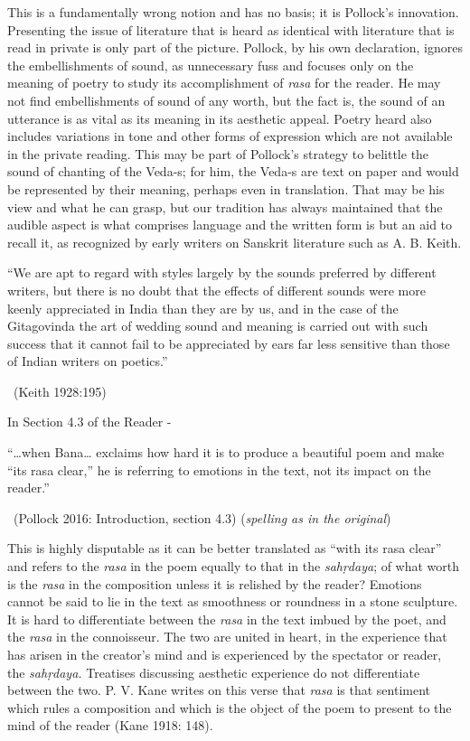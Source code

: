 This is a fundamentally wrong notion and has no basis; it is Pollock’s innovation. Presenting the issue of literature that is heard as identical with literature that is read in private is only part of the picture. Pollock, by his own declaration, ignores the embellishments of sound, as unnecessary fuss and focuses only on the meaning of poetry to study its accomplishment of \textit{rasa} for the reader. He may not find embellishments of sound of any worth, but the fact is, the sound of an utterance is as vital as its meaning in its aesthetic appeal. Poetry heard also includes variations in tone and other forms of expression which are not available in the private reading. This may be part of Pollock’s strategy to belittle the sound of chanting of the Veda-s; for him, the Veda-s are text on paper and would be represented by their meaning, perhaps even in translation. That may be his view and what he can grasp, but our tradition has always maintained that the audible aspect is what comprises language and the written form is but an aid to recall it, as recognized by early writers on Sanskrit literature such as A. B. Keith.

\begin{myquote}
“We are apt to regard with styles largely by the sounds preferred by different writers, but there is no doubt that the effects of different sounds were more keenly appreciated in India than they are by us, and in the case of the Gitagovinda the art of wedding sound and meaning is carried out with such success that it cannot fail to be appreciated by ears far less sensitive than those of Indian writers on poetics.” 

~\hfill (Keith 1928:195)
\end{myquote}

In Section 4.3 of the Reader -

\begin{myquote}
“…when Bana… exclaims how hard it is to produce a beautiful poem and make “its rasa clear,” he is referring to emotions in the text, not its impact on the reader.” 

~\hfill (Pollock 2016: Introduction, section 4.3) (\textit{spelling as in the original})
\end{myquote}

This is highly disputable as it can be better translated as “with its rasa clear” and refers to the \textit{rasa }in the poem equally to that in the \textit{sahṛdaya}; of what worth is the \textit{rasa} in the composition unless it is relished by the reader? Emotions cannot be said to lie in the text as smoothness or roundness in a stone sculpture. It is hard to differentiate between the \textit{rasa} in the text imbued by the poet, and the \textit{rasa} in the connoisseur. The two are united in heart, in the experience that has arisen in the creator’s mind and is experienced by the spectator or reader, the \textit{sahṛdaya.} Treatises discussing aesthetic experience do not differentiate between the two. P. V. Kane writes on this verse that \textit{rasa} is that sentiment which rules a composition and which is the object of the poem to present to the mind of the reader (Kane 1918: 148).

